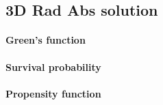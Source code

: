 \subsection{3D Rad Abs solution}

\paragraph{Green's function}

\paragraph{Survival probability}

\paragraph{Propensity function}
